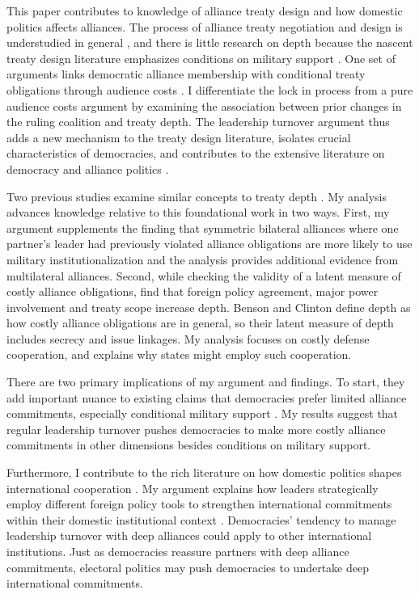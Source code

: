 \documentclass[12pt]{article}
\begin{document}
This paper contributes to knowledge of alliance treaty design and how domestic politics affects alliances.
The process of alliance treaty negotiation and design is understudied in general \citep{Poast2019a}, and there is little research on depth because the nascent treaty design literature emphasizes conditions on military support \citep{Kim2011, Benson2012, Mattes2012, Chibaetal2015, FjelstulReiter2019}.
One set of arguments links democratic alliance membership with conditional treaty obligations through audience costs \citep{Mattes2012, Chibaetal2015, FjelstulReiter2019}. 
I differentiate the lock in process from a pure audience costs argument by examining the association between prior changes in the ruling coalition and treaty depth. 
The leadership turnover argument thus adds a new mechanism to the treaty design literature, isolates crucial characteristics of democracies, and contributes to the extensive literature on democracy and alliance politics \citep{LaiReiter2000, Mattes2012a, McManusYarhi-Milo2017}. 


Two previous studies examine similar concepts to treaty depth \citep{Mattes2012, BensonClinton2016}. 
My analysis advances knowledge relative to this foundational work in two ways.  
First, my argument supplements the finding that symmetric bilateral alliances where one partner's leader had previously violated alliance obligations are more likely to use military institutionalization \citep{Mattes2012} and the analysis provides additional evidence from multilateral alliances.  
Second, while checking the validity of a latent measure of costly alliance obligations, \citet{BensonClinton2016} find that foreign policy agreement, major power involvement and treaty scope increase depth. 
Benson and Clinton define depth as how costly alliance obligations are in general, so their latent measure of depth includes secrecy and issue linkages.
My analysis focuses on costly defense cooperation, and explains why states might employ such cooperation. 


There are two primary implications of my argument and findings. 
To start, they add important nuance to existing claims that democracies prefer limited alliance commitments, especially conditional military support \citep{Mattes2012, Chibaetal2015, FjelstulReiter2019}.
My results suggest that regular leadership turnover pushes democracies to make more costly alliance commitments in other dimensions besides conditions on military support. 


Furthermore, I contribute to the rich literature on how domestic politics shapes international cooperation \citep{DownesRocke1995, Fearon1998, Leeds1999, MattesRodriguez2014}.
My argument explains how leaders strategically employ different foreign policy tools to strengthen international commitments within their domestic institutional context \citep{HydeSaunders2020}.  
Democracies' tendency to manage leadership turnover with deep alliances could apply to other international institutions. 
Just as democracies reassure partners with deep alliance commitments, electoral politics may push democracies to undertake deep international commitments.
\end{document}
